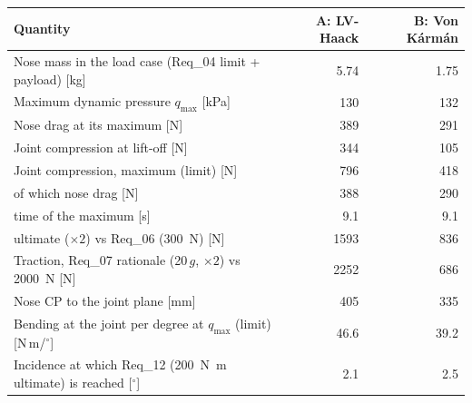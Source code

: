 \begin{tabular}{@{}lrr@{}}
\toprule
Quantity & A: LV-Haack & B: Von K\'arm\'an \\
\midrule
Nose mass in the load case (Req\_04 limit + payload) [kg] & 5.74 & 1.75 \\
Maximum dynamic pressure $q_{\max}$ [kPa] & 130 & 132 \\
Nose drag at its maximum [N] & 389 & 291 \\
Joint compression at lift-off [N] & 344 & 105 \\
Joint compression, maximum (limit) [N] & 796 & 418 \\
\quad of which nose drag [N] & 388 & 290 \\
\quad time of the maximum [s] & 9.1 & 9.1 \\
\quad ultimate ($\times2$) vs Req\_06 (\SI{300}{N}) [N] & 1593 & 836 \\
Traction, Req\_07 rationale (20\,$g$, $\times2$) vs \SI{2000}{N} [N] & 2252 & 686 \\
Nose CP to the joint plane [mm] & 405 & 335 \\
Bending at the joint per degree at $q_{\max}$ (limit) [N\,m/$^\circ$] & 46.6 & 39.2 \\
Incidence at which Req\_12 (\SI{200}{N.m} ultimate) is reached [$^\circ$] & 2.1 & 2.5 \\
\bottomrule
\end{tabular}
